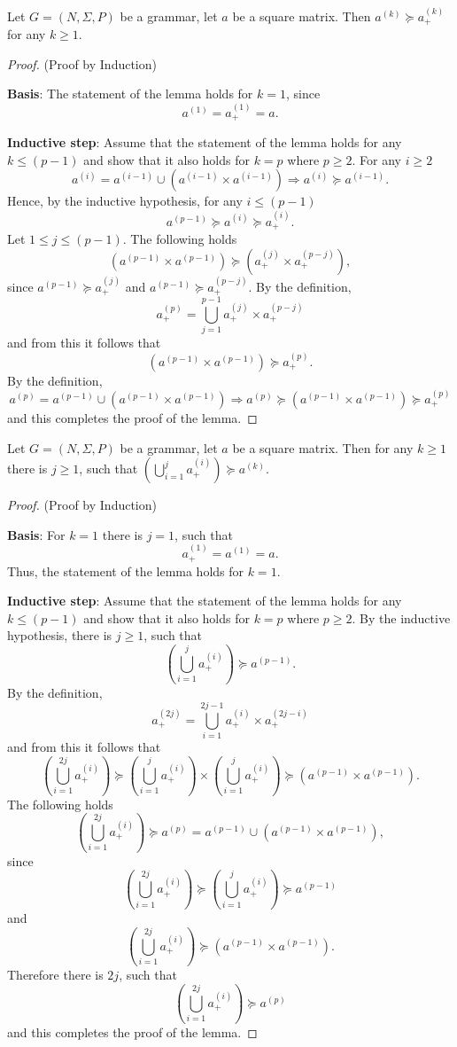 \begin{lemma}\label{lemma:cf_geq_valiant}
	Let $G =(N,\Sigma,P)$ be a grammar, let $a$ be a square matrix. Then $a^{(k)} \succeq a^{(k)}_+$ for any $k \geq 1$.
\end{lemma}
\begin{proof}(Proof by Induction)
	
	\textbf{Basis}: The statement of the lemma holds for $k = 1$, since $$a^{(1)} = a^{(1)}_+ = a.$$
	
	\textbf{Inductive step}: Assume that the statement of the lemma holds for any $k \leq (p - 1)$ and show that it also holds for $k = p$ where $p \geq 2$. For any $i \geq 2$ $$a^{(i)} = a^{(i-1)} \cup (a^{(i-1)} \times a^{(i-1)}) \Rightarrow a^{(i)} \succeq a^{(i-1)}.$$ Hence, by the inductive hypothesis, for any $i \leq (p-1)$ $$a^{(p-1)} \succeq a^{(i)} \succeq a^{(i)}_+.$$ Let $1 \leq j \leq (p - 1)$. The following holds $$(a^{(p-1)} \times a^{(p-1)}) \succeq (a^{(j)}_+ \times a^{(p-j)}_+),$$ since $a^{(p-1)} \succeq a^{(j)}_+$ and $a^{(p-1)} \succeq a^{(p-j)}_+$. By the definition, $$a^{(p)}_+ = \bigcup^{p-1}_{j=1}{a^{(j)}_+ \times a^{(p-j)}_+}$$ and from this it follows that $$(a^{(p-1)} \times a^{(p-1)}) \succeq a^{(p)}_+.$$ By the definition, $$a^{(p)} = a^{(p-1)} \cup (a^{(p-1)} \times a^{(p-1)}) \Rightarrow a^{(p)} \succeq (a^{(p-1)} \times a^{(p-1)}) \succeq a^{(p)}_+$$ and this completes the proof of the lemma.
\end{proof}

\begin{lemma}\label{lemma:valiant_geq_cf}
	Let $G =(N,\Sigma,P)$ be a grammar, let $a$ be a square matrix. Then for any $k \geq 1$ there is $j \geq 1$, such that $(\bigcup^{j}_{i=1}{a^{(i)}_+}) \succeq a^{(k)}$.
\end{lemma}
\begin{proof}(Proof by Induction)
	
	\textbf{Basis}: For $k = 1$ there is $j = 1$, such that $$a^{(1)}_+ = a^{(1)} = a.$$ Thus, the statement of the lemma holds for $k = 1$.
	
	\textbf{Inductive step}: Assume that the statement of the lemma holds for any $k \leq (p - 1)$ and show that it also holds for $k = p$ where $p \geq 2$. By the inductive hypothesis, there is $j \geq 1$, such that $$(\bigcup^{j}_{i=1}{a^{(i)}_+}) \succeq a^{(p-1)}.$$ By the definition, $$a^{(2j)}_+ = \bigcup^{2j-1}_{i=1}{a^{(i)}_+ \times a^{(2j-i)}_+}$$ and from this it follows that $$(\bigcup^{2j}_{i=1}{a^{(i)}_+}) \succeq (\bigcup^{j}_{i=1}{a^{(i)}_+}) \times (\bigcup^{j}_{i=1}{a^{(i)}_+}) \succeq (a^{(p-1)} \times a^{(p-1)}).$$ The following holds $$(\bigcup^{2j}_{i=1}{a^{(i)}_+}) \succeq a^{(p)} = a^{(p-1)} \cup (a^{(p-1)} \times a^{(p-1)}),$$ since $$(\bigcup^{2j}_{i=1}{a^{(i)}_+}) \succeq (\bigcup^{j}_{i=1}{a^{(i)}_+}) \succeq a^{(p-1)}$$ and $$(\bigcup^{2j}_{i=1}{a^{(i)}_+}) \succeq (a^{(p-1)} \times a^{(p-1)}).$$ Therefore there is $2j$, such that $$(\bigcup^{2j}_{i=1}{a^{(i)}_+}) \succeq a^{(p)}$$ and this completes the proof of the lemma.	
\end{proof}


